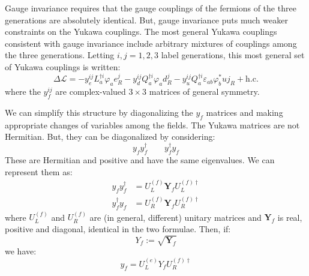 \documentclass[../../main/main.tex]{subfiles}
\begin{document}
Gauge invariance requires that the gauge couplings of the fermions of the three generations are absolutely identical. But, gauge invariance puts much weaker constraints on the Yukawa couplings. The most general Yukawa couplings consistent with gauge invariance include arbitrary mixtures of couplings among the three generations. Letting \( i, j = 1,2,3 \) label generations, this most general set of Yukawa couplings is written:
\begin{equation}
	\Delta \mathcal{L}
	=
	- y_{e}^{ij} L^{\dag i}_a \varphi_a e^{j}_R
	- y_{d}^{ij} Q^{\dag i}_a \varphi_a d^{j}_R
	- y_{u}^{ij} Q^{\dag i}_a \varepsilon_{ab} \varphi^*_b u{j}_R
	+ \text{h.c.}
	\label{eq:}
\end{equation}
where the \( y^{ij}_{f} \) are complex-valued \( 3 \times 3 \) matrices of general symmetry.

We can simplify this structure by diagonalizing the \( y_f \) matrices and making appropriate changes of variables among the fields. The Yukawa matrices are not Hermitian. But, they can be diagonalized by considering:
\begin{equation}
	y_f y_f^{\dag}
	\qquad
	y_f^{\dag} y_f
\end{equation}
These are Hermitian and positive and have the same eigenvalues. We can represent them as:
\begin{align}
	y_f y_f^{\dag} &= U_L^{(f)} \mathbf{Y}_f U_L^{(f)\dag}	\\
	y_f^{\dag} y_f &= U_R^{(f)} \mathbf{Y}_f U_R^{(f)\dag}
\end{align}
where \( U_L^{(f)} \) and \( U_R^{(f)} \) are (in general, different) unitary matrices and \( \mathbf{Y}_f \) is real, positive and diagonal, identical in the two formulae. Then, if:
\begin{equation}
	Y_f
	:=
	\sqrt{\mathbf{Y}_f}
	\label{eq:}
\end{equation}
we have:
\begin{equation}
	y_f
	=
	U_L^{(e)} Y_f U_R^{(f)\dag}
	\label{eq:}
\end{equation}
\end{document}
